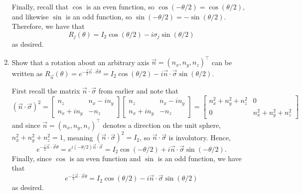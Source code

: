 \documentclass{../../../kin_math}
\begin{document}
\begin{questions}
\begin{enumerate}
\begin{solution}
\begin{equation*}
      \end{equation*}
      Finally, recall that $\cos$ is an even function, so $\cos(-\theta / 2) = \cos(\theta / 2)$, and likewise $\sin$ is an odd function, so $\sin(-\theta / 2) = -\sin(\theta / 2)$. Therefore, we have that
      \begin{equation*}
        R_j(\theta) = I_2 \cos(\theta / 2) - i \sigma_j \sin(\theta / 2)
      \end{equation*}
      as desired.
    \end{solution}
    \item Show that a rotation about an arbitrary axis $\vec{n} = (n_x, n_y, n_z)^\top$ can be written as $R_{\vec{n}}(\theta) = e^{-\frac{i}{2} \vec{n} \cdot \vec{\sigma} \theta} = I_2 \cos(\theta / 2) - i \vec{n} \cdot \vec{\sigma} \sin(\theta / 2)$.
    \begin{solution}
      First recall the matrix $\vec{n} \cdot \vec{\sigma}$ from earlier and note that
      \begin{equation*}
        (\vec{n} \cdot \vec{\sigma})^2 = \begin{bmatrix} n_z & n_x - in_y \\ n_x + in_y & -n_z \end{bmatrix} \begin{bmatrix} n_z & n_x - in_y \\ n_x + in_y & -n_z \end{bmatrix} = \begin{bmatrix} n_x^2 + n_y^2 + n_z^2 & 0 \\ 0 & n_x^2 + n_y^2 + n_z^2 \end{bmatrix}
      \end{equation*}
      and since $\vec{n} = (n_x, n_y, n_z)^\top$ denotes a direction on the unit sphere, $n_x^2 + n_y^2 + n_z^2 = 1$, meaning $(\vec{n} \cdot \vec{\sigma})^2 = I_2$, so $\vec{n} \cdot \vec{\sigma}$ is involutory. Hence,
      \begin{equation*}
        e^{-\frac{i}{2} \vec{n} \cdot \vec{\sigma} \theta} = e^{i (-\theta / 2) \vec{n} \cdot \vec{\sigma}} = I_2 \cos(-\theta / 2) + i \vec{n} \cdot \vec{\sigma} \sin(-\theta / 2).
      \end{equation*}
      Finally, since $\cos$ is an even function and $\sin$ is an odd function, we have that
      \begin{equation*}
        e^{-\frac{i}{2} \vec{n} \cdot \vec{\sigma} \theta} = I_2 \cos(\theta / 2) - i \vec{n} \cdot \vec{\sigma} \sin(\theta / 2)
      \end{equation*}
      as desired.
    \end{solution}
  \end{enumerate}
\end{questions}
\end{document}
